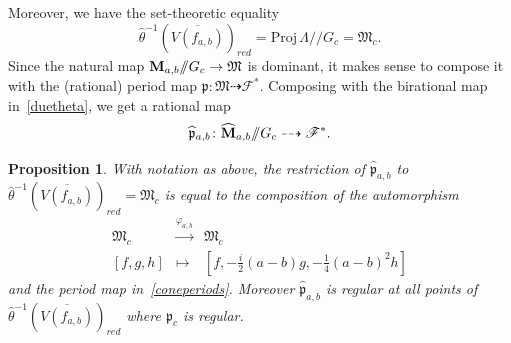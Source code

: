 \documentclass[11pt]{amsart}
\numberwithin{equation}{section}
\theoremstyle{plain}
\newtheorem{proposition}[theorem]{Proposition}
\theoremstyle{remark}
\theoremstyle{definition}
\newcommand{\cF}{\mathscr{F}}
\newcommand{\gp}{\mathfrak{p}}
\newcommand{\Proj}{\mathrm{Proj}}
\newcommand{\gquot}{/\!\!/}
\newcommand{\dra}{\dashrightarrow}
\newcommand{\gM}{\mathfrak{M}}
\newcommand{\lra}{\longrightarrow}
\newcommand{\ov}{\overline}
\newcommand{\wh}{\widehat}
\begin{document}
%
  Moreover,  we have the set-theoretic equality
%
\begin{equation}\label{macerata}
%
\wh{\theta}^{-1}(\ov{V(f_{a,b})})_{red}=\Proj\,\Lambda\gquot   G_c=\gM_c. 
%
\end{equation}
%
 Since the natural map ${\bf M}_{a,b}\gquot   G_c\to\gM$ is dominant, it makes  sense to compose it with the (rational) period map $\gp\colon\gM\dra\cF^{*}$. Composing with the birational map in~\eqref{duetheta}, we get a rational map
%
\begin{equation}\label{visso2}
%
 \wh{\gp}_{a,b}\colon\wh{\bf M}_{a,b}\gquot   G_c\dra \cF^{*}.
%
\end{equation}
%
%
\begin{proposition}\label{prp:redtwotan}
%
With notation as above, the restriction of  $\wh{\gp}_{a,b}$ to $\wh{\theta}^{-1}(\ov{V(f_{a,b})})_{red}=\gM_c$ is equal to the composition of the automorphism
%
\begin{equation}\label{padoan}
%
\begin{matrix}
%
\gM_c & \overset{\varphi_{a,b}}{\lra} & \gM_c \\
%
[f,g,h] & \mapsto & [f,-\frac{i}{2}(a-b)g,-\frac{1}{4}(a-b)^2 h]
%
\end{matrix}
%
%
\end{equation}
%
and the period map in~\eqref{coneperiods}. Moreover 
$\wh{\gp}_{a,b}$ is regular at all points of  $\wh{\theta}^{-1}(\ov{V(f_{a,b})})_{red}$ where $\gp_c$ is regular. 
%
\end{proposition}
%
\end{document}
